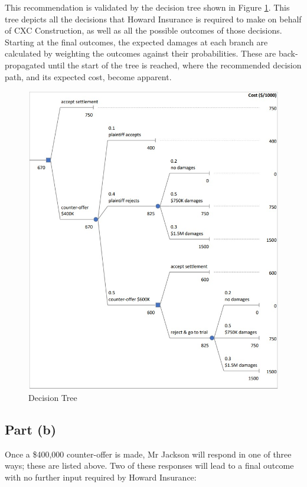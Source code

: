 \documentclass[11pt, a4paper]{article}
\begin{document}
    This recommendation is validated by the decision tree shown in Figure \ref{f1}. This tree depicts all the decisions that Howard Insurance is required to make on behalf of CXC Construction, as well as all the possible outcomes of those decisions. Starting at the final outcomes, the expected damages at each branch are calculated by weighting the outcomes against their probabilities. These are back-propagated until the start of the tree is reached, where the recommended decision path, and its expected cost, become apparent.

    \begin{figure}[hbt!]
        \centering
        \includegraphics[width=\textwidth]{figures/1.jpg}
        \caption{Decision Tree}
        \label{f1}
    \end{figure}

    \subsection*{Part (b)}

    Once a \$400,000 counter-offer is made, Mr Jackson will respond in one of three ways; these are listed above. Two of these responses will lead to a final outcome with no further input required by Howard Insurance:
\end{document}

